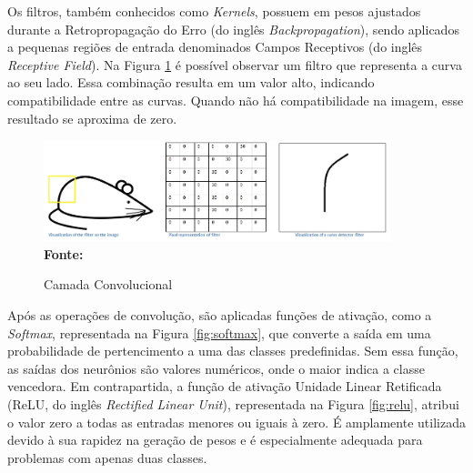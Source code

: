 Os filtros, também conhecidos como \textit{Kernels}, possuem em pesos ajustados durante a Retropropagação do Erro (do inglês \textit{Backpropagation}), sendo aplicados a pequenas regiões de entrada denominados Campos Receptivos (do inglês \textit{Receptive Field}). Na Figura \ref{fig:conv2} é possível observar um filtro que representa a curva ao seu lado. Essa combinação resulta em um valor alto, indicando compatibilidade entre as curvas. Quando não há compatibilidade na imagem, esse resultado se aproxima de zero.

\begin{figure}[ht]
 	\centering	
 	\caption[\hspace{0.1cm}Grade Computacional.]{Camada Convolucional}
 	\vspace{-0.4cm}
 	\includegraphics[width=0.9\textwidth]{figuras/conv.png}
 	\captionsetup{justification=centering}
	\vspace{-0.2cm}
     \\\textbf{\footnotesize Fonte: \cite{cnns}}
	\label{fig:conv2}
\end{figure}


Após as operações de convolução, são aplicadas funções de ativação, como a \textit{Softmax}, representada na Figura \ref{fig:softmax}, que converte a saída em uma probabilidade de pertencimento a uma das classes predefinidas. Sem essa função, as saídas dos neurônios são valores numéricos, onde o maior indica a classe vencedora. Em contrapartida, a função de ativação Unidade Linear Retificada (ReLU, do inglês \textit{Rectified Linear Unit}), representada na Figura \ref{fig:relu}, atribui o valor zero a todas as entradas menores ou iguais à zero. É amplamente utilizada devido à sua rapidez na geração de pesos e é especialmente adequada para problemas com apenas duas classes.

